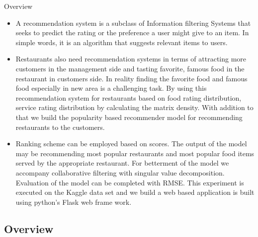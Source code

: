 \documentclass{if-beamer}
\begin{document}
\begin{frame}{Overview}
	\begin{itemize}
		\item A recommendation system is a subclass of Information filtering Systems that seeks to predict the rating or the preference a user might give to an item. In simple words, it is an algorithm that suggests relevant items to users.
		\item  Restaurants also need recommendation systems in terms of attracting more customers in the management side and tasting favorite, famous food in the restaurant in customers side. In reality finding the favorite food and famous food especially in new area is a challenging task. By using this recommendation system for restaurants based on food rating distribution, service rating distribution by calculating the matrix density. With addition to that we build the popularity based recommender model for recommending restaurants to the customers. 
		\item Ranking scheme can be employed based on scores. The output of the model may be recommending most popular restaurants and most popular food items served by the appropriate restaurant. For betterment of the model we accompany collaborative filtering with singular value decomposition. Evaluation of the model can be completed with RMSE. This experiment is executed on the Kaggle data set and we build a web based application is built using python’s Flask web frame work.
	\end{itemize}
\end{frame}

\subsection{Overview}
\end{document}
